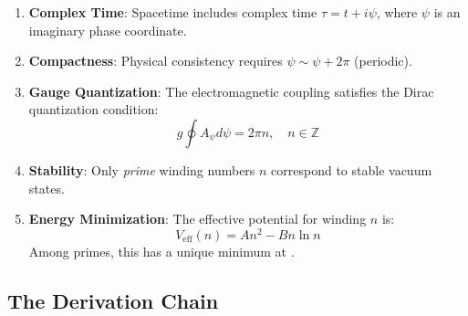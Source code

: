 \documentclass[12pt, a4paper]{article}
\begin{document}
\begin{enumerate}
\item \textbf{Complex Time}: Spacetime includes complex time $\tau = t + i\psi$, where $\psi$ is an imaginary phase coordinate.

\item \textbf{Compactness}: Physical consistency requires $\psi \sim \psi + 2\pi$ (periodic).

\item \textbf{Gauge Quantization}: The electromagnetic coupling satisfies the Dirac quantization condition:
\begin{equation}
g \oint A_\psi d\psi = 2\pi n, \quad n \in \mathbb{Z}
\end{equation}

\item \textbf{Stability}: Only \emph{prime} winding numbers $n$ correspond to stable vacuum states.

\item \textbf{Energy Minimization}: The effective potential for winding $n$ is:
\begin{equation}
V_{\text{eff}}(n) = An^2 - Bn\ln n
\end{equation}
Among primes, this has a unique minimum at .
\end{enumerate}

\subsection{The Derivation Chain}

\begin{center}
\end{center}
\end{document}
